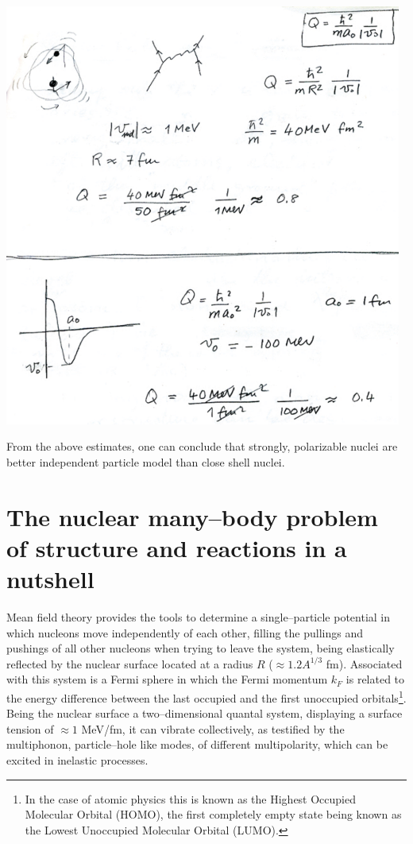 \documentclass[a4paper,onecolumn,superscriptaddress,12pt,nofootinbib,twoside,raggedfooter,notitlepage]{revtex4-1}
\begin{document}
\begin{center}
	\includegraphics[width=0.98\textwidth]{figs/fig_appd}
\end{center}

From the above estimates, one can conclude that strongly, polarizable nuclei are better independent particle model than close shell nuclei.




\pagebreak

\section{The nuclear many--body problem of structure and reactions in a nutshell}

Mean field theory provides the tools to determine a single--particle potential in which nucleons move independently of each other, filling the pullings and pushings of all other nucleons when trying to leave the system, being elastically reflected by the nuclear surface located at a radius $R$ ($\approx 1.2 A^{1/3}$ fm). Associated with this system is a Fermi sphere in which the Fermi momentum $k_F$ is related to the energy difference between the last occupied and the first unoccupied orbitals\footnote{In the case of atomic physics this is known as the Highest Occupied Molecular Orbital (HOMO), the first completely empty state being known as the Lowest Unoccupied Molecular Orbital (LUMO).}. Being the nuclear surface a two--dimensional quantal system, displaying a surface tension of $\approx 1$ MeV/fm, it can vibrate collectively, as testified by the multiphonon, particle--hole like modes, of different multipolarity, which can be excited in inelastic processes.
\end{document}
